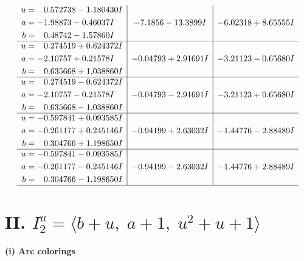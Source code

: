 \documentclass[1p]{elsarticle_modified}
\theoremstyle{definition}
\begin{document}
$$\begin{array}{c|c|c}
\begin{aligned}
u &= \phantom{-}0.572738 - 1.180430 I \\
a &= -1.98873 - 0.46037 I \\
b &= \phantom{-}0.48742 - 1.57860 I\end{aligned}
 & -7.1856 - 13.3899 I & -6.02318 + 8.65555 I \\ \hline\begin{aligned}
u &= \phantom{-}0.274519 + 0.624372 I \\
a &= -2.10757 + 0.21578 I \\
b &= \phantom{-}0.635668 + 1.038860 I\end{aligned}
 & -0.04793 + 2.91691 I & -3.21123 - 0.65680 I \\ \hline\begin{aligned}
u &= \phantom{-}0.274519 - 0.624372 I \\
a &= -2.10757 - 0.21578 I \\
b &= \phantom{-}0.635668 - 1.038860 I\end{aligned}
 & -0.04793 - 2.91691 I & -3.21123 + 0.65680 I \\ \hline\begin{aligned}
u &= -0.597841 + 0.093585 I \\
a &= -0.261177 + 0.245146 I \\
b &= \phantom{-}0.304766 + 1.198650 I\end{aligned}
 & -0.94199 + 2.63032 I & -1.44776 - 2.88489 I \\ \hline\begin{aligned}
u &= -0.597841 - 0.093585 I \\
a &= -0.261177 - 0.245146 I \\
b &= \phantom{-}0.304766 - 1.198650 I\end{aligned}
 & -0.94199 - 2.63032 I & -1.44776 + 2.88489 I\\
 \hline 
 \end{array}$$\newpage\newpage\renewcommand{\arraystretch}{1}
\centering \section*{II. $I^u_{2}= \langle b+u,\;a+1,\;u^2+u+1 \rangle$}
\flushleft \textbf{(i) Arc colorings}\\
\end{document}
